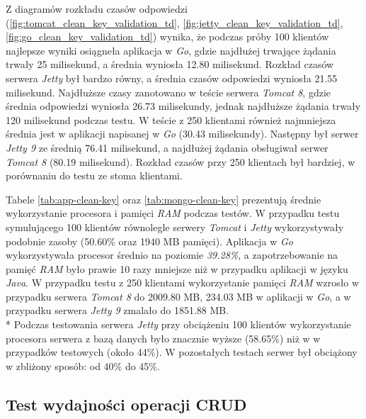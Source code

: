 Z diagramów rozkładu czasów odpowiedzi (\ref{fig:tomcat_clean_key_validation_td},  \ref{fig:jetty_clean_key_validation_td}, \ref{fig:go_clean_key_validation_td}) wynika, że podczas próby 100 klientów najlepsze wyniki osiągneła aplikacja w \textsl{Go}, gdzie najdłużej trwające żądania trwały 25 milisekund, a średnia wyniosła 12.80 milisekund. Rozkład czasów serwera \textsl{Jetty} był bardzo równy, a średnia czasów odpowiedzi wyniosła 21.55 milisekund. Najdłuższe czasy zanotowano w teście serwera \textsl{Tomcat 8}, gdzie średnia odpowiedzi wyniosła 26.73 milisekundy, jednak najdłuższe żądania trwały 120 milisekund podczas testu. W teście z 250 klientami również najmniejsza średnia jest w aplikacji napisanej w \textsl{Go} (30.43 milisekundy). Następny był serwer \textsl{Jetty 9} ze średnią 76.41 milisekund, a najdłużej żądania obsługiwał serwer \textsl{Tomcat 8} (80.19 milisekund). Rozkład czasów przy 250 klientach był bardziej, w porównaniu do testu ze stoma klientami.

Tabele \ref{tab:app-clean-key} oraz \ref{tab:mongo-clean-key} prezentują średnie wykorzystanie procesora i pamięci \textsl{RAM} podczas testów. W przypadku testu symulującego 100 klientów równolegle serwery \textsl{Tomcat} i \textsl{Jetty} wykorzystywały podobnie zasoby (50.60\% oraz 1940 MB pamięci). Aplikacja w \textsl{Go} wykorzystywała procesor średnio na poziomie \textsl{39.28\%}, a zapotrzebowanie na pamięć \textsl{RAM} było prawie 10 razy mniejsze niż w przypadku aplikacji w języku \textsl{Java}. W przypadku testu z 250 klientami wykorzystanie pamięci \textsl{RAM} wzrosło w przypadku serwera \textsl{Tomcat 8} do 2009.80 MB, 234.03 MB w aplikacji w \textsl{Go}, a w przypadku serwera \textsl{Jetty 9} zmalało do 1851.88 MB.\\*
Podczas testowania serwera \textsl{Jetty} przy obciążeniu 100 klientów wykorzystanie procesora serwera z bazą danych było znacznie wyższe (58.65\%) niż w w przypadków testowych (około 44\%).  W pozostałych testach serwer był obciążony w zbliżony sposób: od 40\% do 45\%.
 
% 
% 
\clearpage

\subsection{Test wydajności operacji CRUD}
% 
% 
\clearpage

